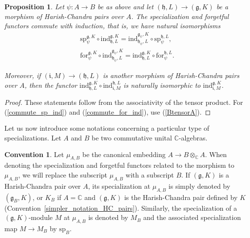 \documentclass{amsart}
\newtheorem{proposition}[theorem]{Proposition}
\theoremstyle{definition}
\newtheorem{convention}{Convention}
\begin{document}
\begin{proposition}\label{properties_ind_res} Let $\psi : A \to B$ be as above and let $(\mathfrak{h},L) \to (\mathfrak{g},K)$ be a morphism of Harish-Chandra pairs over $A$.
    The specialization and forgetful functors commute with induction, that is, we have natural isomorphisms
        \begin{gather}
            \label{commute_sp_ind}\mathrm{sp}_\psi^{\mathfrak{g},K} \circ \mathrm{ind}_{\mathfrak{h},L}^{\mathfrak{g},K} = \mathrm{ind}_{\mathfrak{h}_\psi,L}^{\mathfrak{g}_\psi,K} \circ \mathrm{sp}_\psi^{\mathfrak{h},L},\\
            \label{commute_for_ind}\mathrm{for}_\psi^{\mathfrak{g},K} \circ \mathrm{ind}_{\mathfrak{h}_\psi,L}^{\mathfrak{g}_\psi,K} = \mathrm{ind}_{\mathfrak{h},L}^{\mathfrak{g},K} \circ \mathrm{for}_\psi^{\mathfrak{h},L}.
        \end{gather}
    
    Moreover, if $(\mathfrak{i},M) \to (\mathfrak{h},L)$ is another morphism of Harish-Chandra pairs over $A$, then the functor $\mathrm{ind}_{\mathfrak{h},L}^{\mathfrak{g},K} \circ \mathrm{ind}_{\mathfrak{i},M}^{\mathfrak{h},L}$ is naturally isomorphic to $\mathrm{ind}_{\mathfrak{i},M}^{\mathfrak{g},K}$.
\end{proposition}

\begin{proof}
    These statements follow from the associativity of the tensor product. For (\ref{commute_sp_ind}) and (\ref{commute_for_ind}), use (\ref{BtensorA}).
\end{proof}

Let us now introduce some notations concerning a particular type of specializations. Let $A$ and $B$ be two commutative unital $\mathbb{C}$-algebras.

\begin{convention}\label{notation_specialization_HC}
    Let $\mu_{A,B}$ be the canonical embedding $A \to B\otimes_\mathbb{C} A$. When denoting the specialization and forgetful functors related to the morphism to $\mu_{A,B}$, we will replace the subscript $\mu_{A,B}$ with a subscript $B$. If $(\mathfrak{g},K)$ is a Harish-Chandra pair over $A$, its specialization at $\mu_{A,B}$ is simply denoted by $(\mathfrak{g}_B, K)$, or $K_B$ if $A = \mathbb{C}$ and $(\mathfrak{g},K)$ is the Harish-Chandra pair defined by $K$ (Convention~\ref{simpler_notation_HC_pairs}). Similarly, the specialization of a $(\mathfrak{g},K)$-module $M$ at $\mu_{A,B}$ is denoted by $M_B$ and the associated specialization map $M \to M_B$ by $\mathrm{sp}_B$.
\end{convention}
\end{document}
